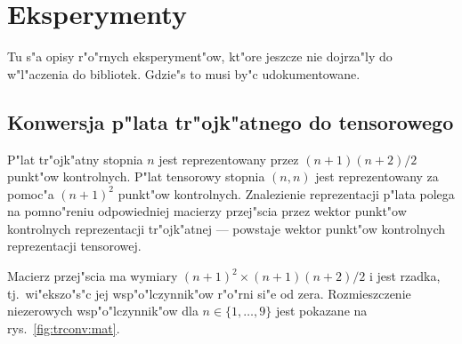 

\chapter{Eksperymenty}

Tu s"a opisy r"o"rnych eksperyment"ow, kt"ore jeszcze nie dojrza"ly do
w"l"aczenia do bibliotek. Gdzie"s to musi by"c udokumentowane.

\section{Konwersja p"lata tr"ojk"atnego do tensorowego}

P"lat tr"ojk"atny stopnia $n$ jest reprezentowany przez $(n+1)(n+2)/2$
punkt"ow kontrolnych. P"lat tensorowy stopnia $(n,n)$ jest reprezentowany za
pomoc"a $(n+1)^2$ punkt"ow kontrolnych. Znalezienie reprezentacji p"lata
polega na pomno"reniu odpowiedniej macierzy przej"scia przez wektor
punkt"ow kontrolnych reprezentacji tr"ojk"atnej --- powstaje wektor punkt"ow
kontrolnych reprezentacji tensorowej.

Macierz przej"scia ma wymiary $(n+1)^2\times(n+1)(n+2)/2$ i jest rzadka,
tj.\ wi"ekszo"s"c jej wsp"o"lczynnik"ow r"o"rni si"e od zera. Rozmieszczenie
niezerowych wsp"o"lczynnik"ow dla $n\in\{1,\ldots,9\}$ jest pokazane na
rys.~\ref{fig:trconv:mat}.

